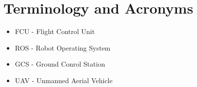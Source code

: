 
\section{Terminology and Acronyms}
\begin{itemize}
\item FCU - Flight Control Unit
\item ROS - Robot Operating System
\item GCS - Ground Conrol Station
\item UAV - Unmanned Aerial Vehicle
\end{itemize}
